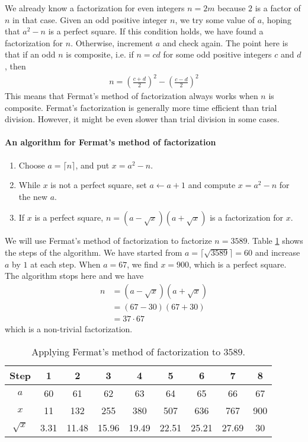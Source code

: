\documentclass{subfiles}
\begin{document}
	We already know a factorization for even integers $n=2m$ because $2$ is a factor of $n$ in that case. Given an odd positive integer $n$, we try some value of $a$, hoping that $a^2-n$ is a perfect square. If this condition holds, we have found a factorization for $n$. Otherwise, increment $a$ and check again. The point here is that if an odd $n$ is composite, i.e. if $n=cd$ for some odd positive integers $c$ and $d$, then
		\begin{align*}
			n = \left(\frac{c+d}{2}\right)^2 - \left(\frac{c-d}{2}\right)^2
		\end{align*}
	This means that Fermat's method of factorization always works when $n$ is composite. Fermat's factorization is generally more time efficient than trial division. However, it might be even slower than trial division in some cases.
	\paragraph{An algorithm for Fermat's method of factorization}
		\begin{enumerate}[1.]
			\item Choose $a=\lceil n \rceil$, and put $x=a^2-n$.
			\item While $x$ is not a perfect square, set $a \longleftarrow a+1$ and compute $x=a^2-n$ for the new $a$.
			\item If $x$ is a perfect square, $n=(a-\sqrt x)(a+\sqrt x)$ is a factorization for $x$.
		\end{enumerate}

	\begin{example}
		We will use Fermat's method of factorization to factorize $n=3589$. Table \ref{table:fermat} shows the steps of the algorithm. We have started from $a=\lceil\sqrt{3589} \rceil=60$ and increase $a$ by $1$ at each step. When $a=67$, we find $x=900$, which is a perfect square. The algorithm stops here and we have
			\begin{align*}
				n &= (a-\sqrt x)(a+\sqrt x)\\
				  &= (67-30)(67+30)\\
				  &= 37 \cdot 67
			\end{align*}
		which is a non-trivial factorization.
			\begin{table}
				\centering
				\begin{tabular}{|c|c|c|c|c|c|c|c| c|}
					\hline
					Step & 1 & 2 & 3 & 4 & 5 & 6 & 7 & 8 \\
					\hline
					$a$ & 60 & 61 & 62 & 63 & 64 & 65 & 66 & 67 \\
					\hline
					$x$ & 11 & 132 & 255 & 380 & 507 & 636 & 767 & 900 \\
					\hline
					$\sqrt x$ & 3.31 & 11.48 & 15.96 & 19.49 & 22.51 & 25.21 & 27.69 & 30 \\
					\hline
				\end{tabular}
				\caption{Applying Fermat's method of factorization to $3589$.}
				\label{table:fermat}
			\end{table}
	\end{example}
\end{document}
